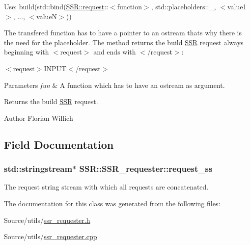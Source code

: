 Use\-: build(std\-::bind(\hyperlink{namespaceSSR_1_1request}{S\-S\-R\-::request}\-:\-:$<$function$>$, std\-::placeholders\-::\-\_, $<$value1$>$, ..., $<$value\-N$>$))

The transfered function has to have a pointer to an ostream thats why there is the need for the placeholder. The method returns the build \hyperlink{namespaceSSR}{S\-S\-R} request always beginning with $<$request$>$ and ends with $<$/request$>$\-:

{\ttfamily $<$request$>$I\-N\-P\-U\-T$<$/request$>$}


\begin{DoxyParams}{Parameters}
{\em fun} & A function which has to have an ostream as argument. \\
\hline
\end{DoxyParams}
\begin{DoxyReturn}{Returns}
the build \hyperlink{namespaceSSR}{S\-S\-R} request. 
\end{DoxyReturn}
\begin{DoxyAuthor}{Author}
Florian Willich 
\end{DoxyAuthor}


\subsection{Field Documentation}
\hypertarget{classSSR_1_1SSR__requester_af84b6008c29f0403d75c15c5c0e1d3a8}{
\subsubsection[{request\-\_\-ss}]{\setlength{\rightskip}{0pt plus 5cm}std\-::stringstream$\ast$ S\-S\-R\-::\-S\-S\-R\-\_\-requester\-::request\-\_\-ss\hspace{0.3cm}{\ttfamily [private]}}}\label{classSSR_1_1SSR__requester_af84b6008c29f0403d75c15c5c0e1d3a8}
The request string stream with which all requests are concatenated. 

The documentation for this class was generated from the following files\-:\begin{DoxyCompactItemize}
\item 
Source/utils/\hyperlink{ssr__requester_8h}{ssr\-\_\-requester.\-h}\item 
Source/utils/\hyperlink{ssr__requester_8cpp}{ssr\-\_\-requester.\-cpp}\end{DoxyCompactItemize}
